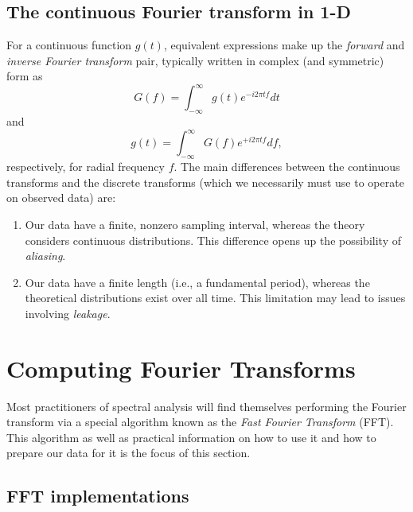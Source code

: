 \subsection{The continuous Fourier transform in 1-D}

For a continuous function $g(t)$,  equivalent expressions make up the \emph{forward} and \emph{inverse Fourier transform} pair,
typically written in complex (and symmetric) form as
\begin{equation}
G(f) = \int ^\infty _{-\infty} g(t) e^{-i 2 \pi t f} dt
\label{eq:FT1D}
\end{equation}
and
\begin{equation}
g(t) = \int ^\infty _{-\infty} G(f) e^{+i 2 \pi t f} df,
\label{eq:IFT1D}
\end{equation}
respectively, for radial frequency $f$.  The main differences between the continuous transforms and the discrete transforms
(which we necessarily must use to operate on observed data) are:
\begin{enumerate}
	\item Our data have a finite, nonzero sampling interval, whereas the theory considers continuous distributions.
	This difference opens up the possibility of \emph{aliasing}.
	\item Our data have a finite length (i.e., a fundamental period), whereas the theoretical distributions exist over all time.
	This limitation may lead to issues involving \emph{leakage}.
\end{enumerate}

\section{Computing Fourier Transforms}
Most practitioners of spectral analysis will find themselves performing the Fourier transform via a special
algorithm known as the \emph{Fast Fourier Transform} (FFT).  This algorithm as well as practical information on how
to use it and how to prepare our data for it is the focus of this section.

\subsection{FFT implementations}

